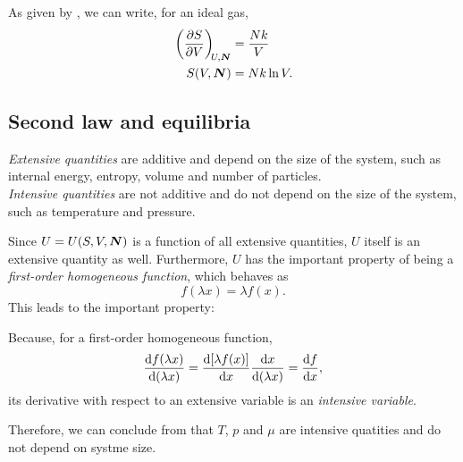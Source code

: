 \begin{coro}
As given by , we can write, for an ideal gas, 
\begin{subequations}
\begin{align}
\diffp SV[U,\bvec{N}]&=\frac{Nk}{V} \\
S(V,\bvec{N})&=Nk\ln V. 
\end{align}
\end{subequations}
\end{coro}

\subsection{Second law and equilibria}
\begin{defi}
\textit{Extensive quantities} are additive and depend on the size of the system, such as internal energy, entropy, volume and number of particles. \\
\textit{Intensive quantities} are not additive and do not depend on the size of the system, such as temperature and pressure. 
\end{defi}
\begin{defi}
Since $U=U(S,V,\boldsymbol{N})$ is a function of all extensive quantities, $U$ itself is an extensive quantity as well. Furthermore, $U$ has the important property of being a \textit{first-order homogeneous function}, which behaves as 
\begin{equation}
f(\lambda x)=\lambda f(x).
\end{equation}
This leads to the important property: 
\end{defi}
\begin{prt}
Because, for a first-order homogeneous function, 
\begin{equation}
\diff{f(\lambda x)}{(\lambda x)}=\diff{[\lambda f(x)]}{x}\diff{x}{(\lambda x)}=\diff{f}{x}, 
\end{equation}
\ie its derivative with respect to an extensive variable is an \textit{intensive variable}. 
\end{prt}
Therefore, we can conclude from  that $T$, $p$ and $\mu$ are intensive quatities and do not depend on systme size.
